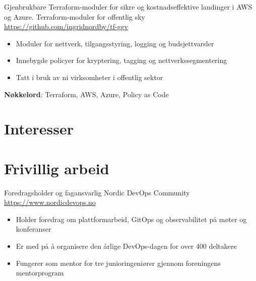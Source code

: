 \documentclass[a4paper, serif, 10pt]{moderncv}
\begin{document}
        {Gjenbrukbare Terraform-moduler for sikre og kostnadseffektive landinger i AWS og Azure.}
        {Terraform-moduler for offentlig sky}
        {\url{https://github.com/ingridnordby/tf-ggv}}
        {}
        {\begin{itemize}
\item Moduler for nettverk, tilgangsstyring, logging og budsjettvarsler
\item Innebygde policyer for kryptering, tagging og nettverkssegmentering
\item Tatt i bruk av ni virksomheter i offentlig sektor
\end{itemize}
\textbf{Nøkkelord}: Terraform, AWS, Azure, Policy as Code}
\section{Interesser}

\section{Frivillig arbeid}

        {Foredragsholder og fagansvarlig}
        {Nordic DevOps Community}
        {\url{https://www.nordicdevops.no}}
        {}
        {\begin{itemize}
\item Holder foredrag om plattformarbeid, GitOps og observabilitet på møter og konferanser
\item Er med på å organisere den årlige DevOps-dagen for over 400 deltakere
\item Fungerer som mentor for tre junioringeniører gjennom foreningens mentorprogram
\end{itemize}}
    
\end{document}
